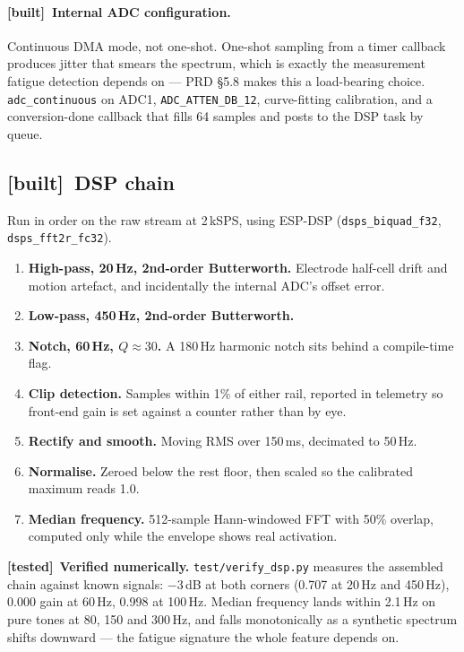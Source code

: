 \documentclass[11pt]{article}
\newcommand{\built}{{\sffamily\scriptsize\color{good}\textbf{[built]}}\ }
\newcommand{\tested}{{\sffamily\scriptsize\color{annot}\textbf{[tested]}}\ }
\begin{document}
\paragraph{\built Internal ADC configuration.} Continuous DMA mode, not
one-shot. One-shot sampling from a timer callback produces jitter that smears
the spectrum, which is exactly the measurement fatigue detection depends on
--- PRD \S5.8 makes this a load-bearing choice. \texttt{adc\_continuous} on
ADC1, \texttt{ADC\_ATTEN\_DB\_12}, curve-fitting calibration, and a
conversion-done callback that fills 64 samples and posts to the DSP task by
queue.

\subsection{\built DSP chain}

Run in order on the raw stream at 2\,kSPS, using ESP-DSP
(\texttt{dsps\_biquad\_f32}, \texttt{dsps\_fft2r\_fc32}).

\begin{enumerate}
\item \textbf{High-pass, 20\,Hz, 2nd-order Butterworth.} Electrode half-cell
drift and motion artefact, and incidentally the internal ADC's offset error.
\item \textbf{Low-pass, 450\,Hz, 2nd-order Butterworth.}
\item \textbf{Notch, 60\,Hz, $Q \approx 30$.} A 180\,Hz harmonic notch sits
behind a compile-time flag.
\item \textbf{Clip detection.} Samples within 1\% of either rail, reported in
telemetry so front-end gain is set against a counter rather than by eye.
\item \textbf{Rectify and smooth.} Moving RMS over 150\,ms, decimated to 50\,Hz.
\item \textbf{Normalise.} Zeroed below the rest floor, then scaled so the
calibrated maximum reads 1.0.
\item \textbf{Median frequency.} 512-sample Hann-windowed FFT with 50\%
overlap, computed only while the envelope shows real activation.
\end{enumerate}

\begin{callout}
\tested \textbf{Verified numerically.} \texttt{test/verify\_dsp.py} measures
the assembled chain against known signals: $-3$\,dB at both corners (0.707 at
20\,Hz and 450\,Hz), 0.000 gain at 60\,Hz, 0.998 at 100\,Hz. Median frequency
lands within 2.1\,Hz on pure tones at 80, 150 and 300\,Hz, and falls
monotonically as a synthetic spectrum shifts downward --- the fatigue
signature the whole feature depends on.
\end{callout}
\end{document}
